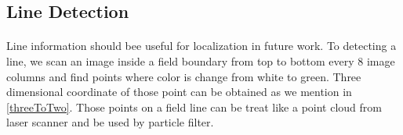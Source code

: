 	\subsection{Line Detection}
	\paragraph{}
	Line information should bee useful for localization in future work. To detecting a line, we scan an image inside a field boundary from top to bottom every 8 image columns and find points where color is change from white to green. Three dimensional coordinate of those point can be obtained as we mention in \ref{threeToTwo}. Those points on a field line can be treat like a point cloud from laser scanner and be used by particle filter.
	
	
	